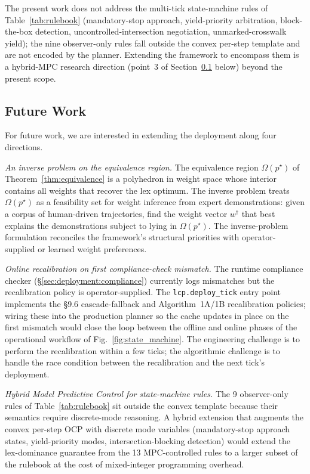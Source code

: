 The present work does not address the multi-tick state-machine rules of Table~\ref{tab:rulebook} (mandatory-stop approach, yield-priority arbitration, block-the-box detection, uncontrolled-intersection negotiation, unmarked-crosswalk yield); the nine observer-only rules fall outside the convex per-step template and are not encoded by the planner. Extending the framework to encompass them is a hybrid-MPC research direction (point~3 of Section~\ref{sec:conclusion:future} below) beyond the present scope.

\subsection{Future Work}
\label{sec:conclusion:future}

For future work, we are interested in extending the deployment along four directions.

\emph{An inverse problem on the equivalence region.} The equivalence region $\Omega(p^{\star})$ of Theorem~\ref{thm:equivalence} is a polyhedron in weight space whose interior contains all weights that recover the lex optimum. The inverse problem treats $\Omega(p^{\star})$ as a feasibility set for weight inference from expert demonstrations: given a corpus of human-driven trajectories, find the weight vector $w^{\dagger}$ that best explains the demonstrations subject to lying in $\Omega(p^{\star})$. The inverse-problem formulation reconciles the framework's structural priorities with operator-supplied or learned weight preferences.

\emph{Online recalibration on first compliance-check mismatch.} The runtime compliance checker (\S\ref{sec:deployment:compliance}) currently logs mismatches but the recalibration policy is operator-supplied. The \texttt{lcp.deploy\_tick} entry point implements the \cite{lcp2025} \S9.6 cascade-fallback and Algorithm~1A/1B recalibration policies; wiring these into the production planner so the cache updates in place on the first mismatch would close the loop between the offline and online phases of the operational workflow of Fig.~\ref{fig:state_machine}. The engineering challenge is to perform the recalibration within a few ticks; the algorithmic challenge is to handle the race condition between the recalibration and the next tick's deployment.

\emph{Hybrid Model Predictive Control for state-machine rules.} The 9 observer-only rules of Table~\ref{tab:rulebook} sit outside the convex template because their semantics require discrete-mode reasoning. A hybrid extension that augments the convex per-step OCP with discrete mode variables (mandatory-stop approach states, yield-priority modes, intersection-blocking detection) would extend the lex-dominance guarantee from the 13 MPC-controlled rules to a larger subset of the rulebook at the cost of mixed-integer programming overhead.

